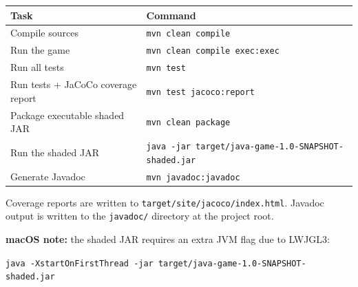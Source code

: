 \documentclass[12pt]{article}
\begin{document}
\begin{center}
\renewcommand{\arraystretch}{1.2}
\begin{tabular}{ll}
\toprule
\textbf{Task} & \textbf{Command} \\
\midrule
Compile sources                        & \texttt{mvn clean compile} \\
Run the game                           & \texttt{mvn clean compile exec:exec} \\
Run all tests                          & \texttt{mvn test} \\
Run tests + JaCoCo coverage report     & \texttt{mvn test jacoco:report} \\
Package executable shaded JAR          & \texttt{mvn clean package} \\
Run the shaded JAR                     & \texttt{java -jar target/java-game-1.0-SNAPSHOT-shaded.jar} \\
Generate Javadoc                       & \texttt{mvn javadoc:javadoc} \\
\bottomrule
\end{tabular}
\end{center}

Coverage reports are written to \texttt{target/site/jacoco/index.html}. Javadoc output is written to the \texttt{javadoc/} directory at the project root.

\medskip
\noindent\textbf{macOS note:} the shaded JAR requires an extra JVM flag due to LWJGL3:
\begin{center}
\texttt{java -XstartOnFirstThread -jar target/java-game-1.0-SNAPSHOT-shaded.jar}
\end{center}
\end{document}
